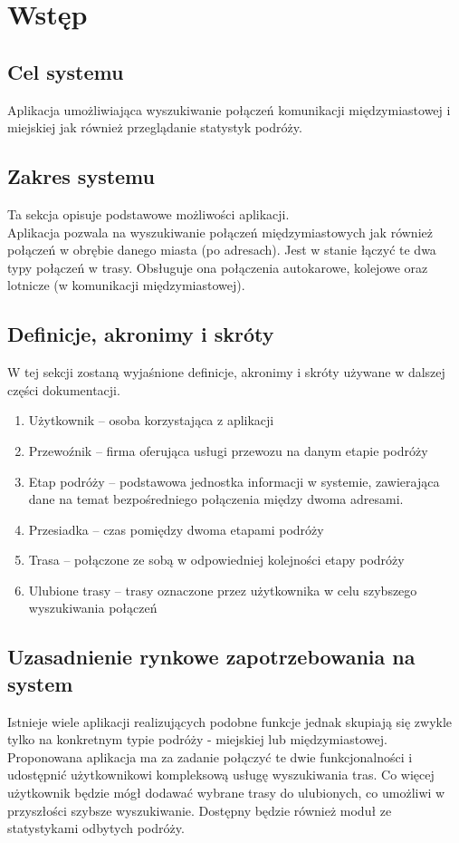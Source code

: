 \documentclass[12pt,a4paper]{report}
\begin{document}
\section{Wstęp}
\subsection{Cel systemu}
	Aplikacja umożliwiająca wyszukiwanie połączeń komunikacji międzymiastowej i miejskiej jak również przeglądanie statystyk podróży.
\subsection{Zakres systemu}
	Ta sekcja opisuje podstawowe możliwości aplikacji.\\[0.3cm]
	Aplikacja pozwala na wyszukiwanie połączeń międzymiastowych jak również połączeń w obrębie danego miasta (po adresach). Jest w stanie łączyć te dwa typy połączeń w trasy. Obsługuje ona połączenia autokarowe, kolejowe oraz lotnicze (w komunikacji międzymiastowej).
\subsection{Definicje, akronimy i skróty}
	W tej sekcji zostaną wyjaśnione definicje, akronimy i skróty używane w dalszej części dokumentacji.
\begin{enumerate}
	\item Użytkownik -- osoba korzystająca z aplikacji
	\item Przewoźnik -- firma oferująca usługi przewozu na danym etapie podróży
	\item Etap podróży -- podstawowa jednostka informacji w systemie, zawierająca dane na temat bezpośredniego połączenia między dwoma adresami.
	\item Przesiadka -- czas pomiędzy dwoma etapami podróży
	\item Trasa -- połączone ze sobą w odpowiedniej kolejności etapy podróży
	\item Ulubione trasy -- trasy oznaczone przez użytkownika w celu szybszego wyszukiwania połączeń
\end{enumerate}
\subsection{Uzasadnienie rynkowe zapotrzebowania na system}
	Istnieje wiele aplikacji realizujących podobne funkcje jednak skupiają się zwykle tylko na konkretnym typie podróży - miejskiej lub międzymiastowej. Proponowana aplikacja ma za zadanie połączyć te dwie funkcjonalności i udostępnić użytkownikowi kompleksową usługę wyszukiwania tras. Co więcej użytkownik będzie mógł dodawać wybrane trasy do ulubionych, co umożliwi w przyszłości szybsze wyszukiwanie. Dostępny będzie również moduł ze statystykami odbytych podróży.
\newpage
\end{document}
